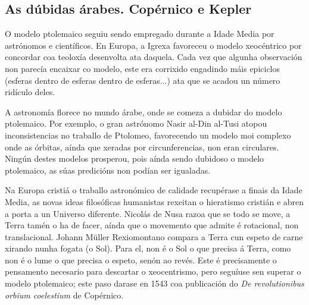 \begin{refsection}
\begin{multicols}{2}
\subsection*{As dúbidas árabes. Copérnico e Kepler}

O modelo ptolemaico seguiu sendo empregado durante a Idade Media por astrónomos
e científicos. En Europa, a Igrexa favoreceu o modelo xeocéntrico por concordar
coa teoloxía desenvolta ata daquela. Cada vez que algunha observación non
parecía encaixar co modelo, este era corrixido engadindo máis epiciclos
(esferas dentro de esferas dentro de esferas...) ata que se acadou un número
ridículo deles.

A astronomía florece no mundo árabe, onde se comeza a dubidar do modelo
ptolemaico. Por exemplo, o gran astrónomo Nasir al-Din al-Tusi atopou
inconsistencias no traballo de Ptolomeo, favorecendo un modelo moi complexo
onde as órbitas, aínda que xeradas por circunferencias, non eran circulares.
Ningún destes modelos prosperou, pois aínda sendo dubidoso o modelo ptolemaico,
as súas predicións non podían ser igualadas.

Na Europa cristiá o traballo astronómico de calidade recupérase a finais da
Idade Media, as novas ideas filosóficas humanistas rexeitan o hieratismo
cristián e abren a porta a un Universo diferente. Nicolás de Nusa razoa que se
todo se move, a Terra tamén o ha de facer, aínda que o movemento que admite é
rotacional, non translacional. Johann Müller Rexiomontano compara a Terra cun
espeto de carne xirando nunha fogata (o Sol). Para el, non é o Sol o que
precisa á Terra, como non é o lume o que precisa o espeto, senón ao revés. Este
é precisamente o pensamento necesario para descartar o xeocentrismo, pero
seguíuse sen superar o modelo ptolemaico; este paso darase en 1543 coa
publicación do \textit{De revolutionibus orbium coelestium} de Copérnico.


\end{multicols}
\end{refsection}
